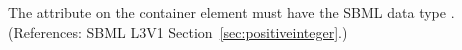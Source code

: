The  attribute on the  container element
must have the SBML data type .  (References: SBML
L3V1 Section~\ref{sec:positiveinteger}.)
